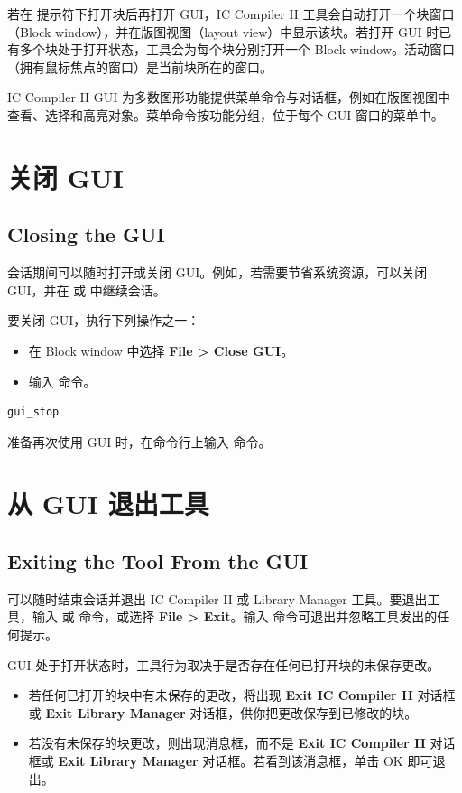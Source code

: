 若在  提示符下打开块后再打开 GUI，IC Compiler II 工具会自动打开一个块窗口（Block window），并在版图视图（layout view）中显示该块。若打开 GUI 时已有多个块处于打开状态，工具会为每个块分别打开一个 Block window。活动窗口（拥有鼠标焦点的窗口）是当前块所在的窗口。

IC Compiler II GUI 为多数图形功能提供菜单命令与对话框，例如在版图视图中查看、选择和高亮对象。菜单命令按功能分组，位于每个 GUI 窗口的菜单中。

\section{关闭 GUI}
\subsection*{Closing the GUI}

会话期间可以随时打开或关闭 GUI。例如，若需要节省系统资源，可以关闭 GUI，并在  或  中继续会话。

要关闭 GUI，执行下列操作之一：
\begin{itemize}
  \item 在 Block window 中选择 \textbf{File > Close GUI}。
  \item 输入  命令。
\end{itemize}
\begin{lstlisting}
gui_stop
\end{lstlisting}

准备再次使用 GUI 时，在命令行上输入  命令。

\section{从 GUI 退出工具}
\subsection*{Exiting the Tool From the GUI}

可以随时结束会话并退出 IC Compiler II 或 Library Manager 工具。要退出工具，输入  或  命令，或选择 \textbf{File > Exit}。输入  命令可退出并忽略工具发出的任何提示。

GUI 处于打开状态时，工具行为取决于是否存在任何已打开块的未保存更改。
\begin{itemize}
  \item 若任何已打开的块中有未保存的更改，将出现 \textbf{Exit IC Compiler II} 对话框或 \textbf{Exit Library Manager} 对话框，供你把更改保存到已修改的块。
  \item 若没有未保存的块更改，则出现消息框，而不是 \textbf{Exit IC Compiler II} 对话框或 \textbf{Exit Library Manager} 对话框。若看到该消息框，单击 OK 即可退出。
\end{itemize}

